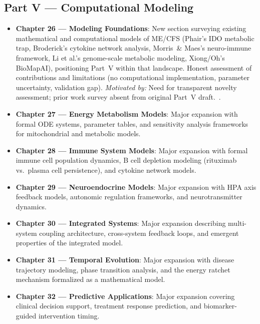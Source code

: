 \subsection*{Part V --- Computational Modeling}

\begin{itemize}

  \item \textbf{Chapter 26 --- Modeling Foundations}: New section surveying
    existing mathematical and computational models of ME/CFS (Phair's IDO
    metabolic trap, Broderick's cytokine network analysis, Morris~\& Maes's
    neuro-immune framework, Li et al.'s genome-scale metabolic modeling,
    Xiong/Oh's BioMapAI), positioning Part~V within that landscape. Honest
    assessment of contributions and limitations (no computational implementation,
    parameter uncertainty, validation gap).
    \textit{Motivated by:} Need for transparent novelty assessment; prior work
    survey absent from original Part~V
    draft.~\cite{broderick2010cytokine,morris2013neuroimmune,phair2019ido,li2025systems,xiong2025biomap}.

  \item \textbf{Chapter 27 --- Energy Metabolism Models}: Major expansion with
    formal ODE systems, parameter tables, and sensitivity analysis frameworks
    for mitochondrial and metabolic models.

  \item \textbf{Chapter 28 --- Immune System Models}: Major expansion with
    formal immune cell population dynamics, B cell depletion modeling (rituximab
    vs.\ plasma cell persistence), and cytokine network models.

  \item \textbf{Chapter 29 --- Neuroendocrine Models}: Major expansion with
    HPA axis feedback models, autonomic regulation frameworks, and
    neurotransmitter dynamics.

  \item \textbf{Chapter 30 --- Integrated Systems}: Major expansion describing
    multi-system coupling architecture, cross-system feedback loops, and
    emergent properties of the integrated model.

  \item \textbf{Chapter 31 --- Temporal Evolution}: Major expansion with
    disease trajectory modeling, phase transition analysis, and the
    energy ratchet mechanism formalized as a mathematical model.

  \item \textbf{Chapter 32 --- Predictive Applications}: Major expansion
    covering clinical decision support, treatment response prediction,
    and biomarker-guided intervention timing.


\end{itemize}
